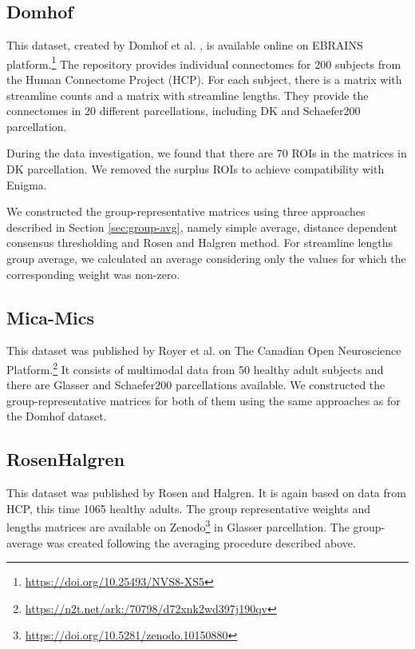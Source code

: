 \subsection{Domhof}

This dataset, created by Domhof et al. \cite{domhof_parcellation-based_2022}, is available online on EBRAINS platform.\footnote{\url{https://doi.org/10.25493/NVS8-XS5}} The repository provides individual connectomes for 200 subjects from the Human Connectome Project (HCP). For each subject, there is a matrix with streamline counts and a matrix with streamline lengths. They provide the connectomes in 20 different parcellations, including DK and Schaefer200 parcellation. 

During the data investigation, we found that there are 70 ROIs in the matrices in DK parcellation. We removed the surplus ROIs to achieve compatibility with Enigma.

We constructed the group-representative matrices using three approaches described in Section \ref{sec:group-avg}, namely simple average, distance dependent consensus thresholding and Rosen and Halgren method. For streamline lengths group average, we calculated an average considering only the values for which the corresponding weight was non-zero.

\subsection{Mica-Mics}

This dataset was published by Royer et al. \cite{royer_open_2021} on The Canadian Open Neuroscience Platform.\footnote{\url{https://n2t.net/ark:/70798/d72xnk2wd397j190qv}} It consists of multimodal data from 50 healthy adult subjects and there are Glasser and Schaefer200 parcellations available. We constructed the group-representative matrices for both of them using the same approaches as for the Domhof dataset.

\subsection{RosenHalgren}

This dataset was published by Rosen and Halgren. \cite{rosen_whole-cortex_2021} It is again based on data from HCP, this time 1065 healthy adults. The group representative weights and lengths matrices are available on Zenodo\footnote{\url{https://doi.org/10.5281/zenodo.10150880}} in Glasser parcellation. The group-average was created following the averaging procedure described above. 

